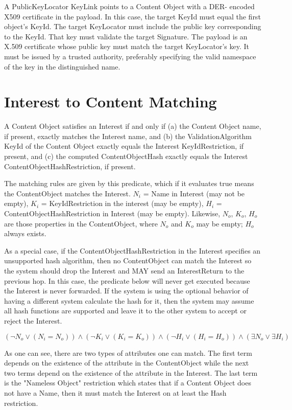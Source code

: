 \documentclass[12pt]{article}
\begin{document}
A PublicKeyLocator KeyLink points to a Content Object with a DER-
encoded X509 certificate in the payload.  In this case, the target
KeyId must equal the first object's KeyId.  The target KeyLocator
must include the public key corresponding to the KeyId.  That key
must validate the target Signature.  The payload is an X.509
certificate whose public key must match the target KeyLocator's key.
It must be issued by a trusted authority, preferably specifying the
valid namespace of the key in the distinguished name.

\section{Interest to Content Matching} \label{sec:matching}
A Content Object satisfies an Interest if and only if (a) the Content
Object name, if present, exactly matches the Interest name, and (b)
the ValidationAlgorithm KeyId of the Content Object exactly equals
the Interest KeyIdRestriction, if present, and (c) the computed
ContentObjectHash exactly equals the Interest
ContentObjectHashRestriction, if present.

The matching rules are given by this predicate, which if it evaluates
true means the ContentObject matches the Interest.  $N_i$ = Name in
Interest (may not be empty), $K_i$ = KeyIdRestriction in the interest
(may be empty), $H_i$ = ContentObjectHashRestriction in Interest (may be
empty).  Likewise, $N_o$, $K_o$, $H_o$ are those properties in the
ContentObject, where $N_o$ and $K_o$ may be empty; $H_o$ always exists.

As a special case, if the ContentObjectHashRestriction in the
Interest specifies an unsupported hash algorithm, then no
ContentObject can match the Interest so the system should drop the
Interest and MAY send an InterestReturn to the previous hop.  In this
case, the predicate below will never get executed because the
Interest is never forwarded.  If the system is using the optional
behavior of having a different system calculate the hash for it, then
the system may assume all hash functions are supported and leave it
to the other system to accept or reject the Interest.

$$
(\neg N_o \lor (N_i=N_o)) \land (\neg K_i \lor (K_i=K_o)) \land (\neg H_i \lor (H_i=H_o)) \land (\exists N_o \lor \exists H_i)
$$

As one can see, there are two types of attributes one can match.  The
first term depends on the existence of the attribute in the
ContentObject while the next two terms depend on the existence of the
attribute in the Interest.  The last term is the "Nameless Object"
restriction which states that if a Content Object does not have a
Name, then it must match the Interest on at least the Hash
restriction.
\end{document}
